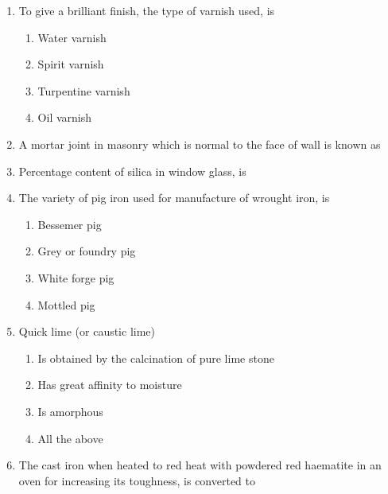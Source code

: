 \documentclass[11pt,a4paper]{article}
\begin{document}
\begin{enumerate}
\item{To give a brilliant finish, the type of varnish used, is}
\begin{enumerate}[label=\Alph*.]
\item{Water varnish}
\item{Spirit varnish}
\item{Turpentine varnish}
\item{Oil varnish}
\end{enumerate}
\item{A mortar joint in masonry which is normal to the face of wall is known as}
\\
\item{Percentage content of silica in window glass, is}
\\
\item{The variety of pig iron used for manufacture of wrought iron, is}
\begin{enumerate}[label=\Alph*.]
\item{Bessemer pig}
\item{Grey or foundry pig}
\item{White forge pig}
\item{Mottled pig}
\end{enumerate}
\item{Quick lime (or caustic lime)}
\begin{enumerate}[label=\Alph*.]
\item{Is obtained by the calcination of pure lime stone}
\item{Has great affinity to moisture}
\item{Is amorphous}
\item{All the above}
\end{enumerate}
\item{The cast iron when heated to red heat with powdered red haematite in an oven for increasing its toughness, is converted to}

\end{enumerate}
\end{document}
